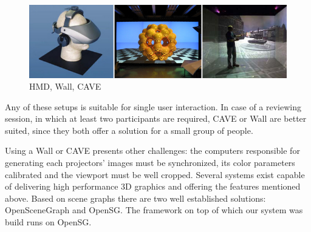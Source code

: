 \begin{figure}[!ht]
	\centering
	\includegraphics[width=12cm]{gfx/hmd-cluster-cave.png}
	\caption{HMD, Wall, CAVE}
	\label{FIG-HMD-CLUSTER-CAVE}
\end{figure}

Any of these setups is suitable for single user interaction.
In case of a reviewing session, in which at least two participants are required,
CAVE or Wall are better suited, since they both offer a solution for a small group of people.

Using a Wall or CAVE presents other challenges: the computers responsible for
generating each projectors' images must be synchronized, its color parameters calibrated
and the viewport must be well cropped.
Several systems exist capable of delivering high performance 3D graphics and
offering the features mentioned above.
Based on scene graphs there are two well established solutions:
OpenSceneGraph\cite{SITE-OSG} and OpenSG\cite{SITE-OPENSG}.
The framework on top of which our system was build runs on OpenSG.